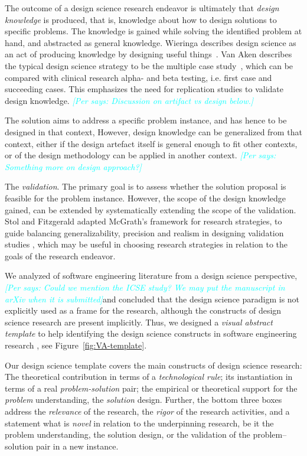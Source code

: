 \documentclass[graybox]{svmult}
\newcommand{\per}[1]{\textcolor{cyan}{{\it [Per says: #1]}}}
\newcommand{\per}[1]{}
\begin{document}
The outcome of a design science research endeavor is ultimately that \emph{design knowledge} is produced, that is, knowledge about how to design solutions to specific problems. The knowledge is gained while solving the identified problem at hand, and abstracted as general knowledge. Wieringa describes design science as an act of producing knowledge by designing useful things~\cite{wieringa_design_2009}.  Van Aken describes the typical design science strategy to be the multiple case study~\cite{van_aken_management_2004}, which can be compared with clinical research alpha- and beta testing, i.e. first case and succeeding cases. This emphasizes the need for replication studies to validate design knowledge. \per{Discussion on artifact vs design below.}

The solution aims to address a specific problem instance, and has hence to be designed in that context, However, design knowledge can be generalized from that context, either if the design artefact itself is general enough to fit other contexts, or of the design methodology can be applied in another context.
\per{Something more on design approach?}

The \emph{validation}. The primary goal is to assess whether the solution proposal is feasible for the problem instance. However, the scope of the design knowledge gained, can be extended by systematically extending the scope of the validation.  Stol and Fitzgerald adapted McGrath's framework for research strategies, to guide balancing generalizability, precision and realism in designing validation studies \cite{StolABC18}, which may be useful in choosing research strategies in relation to the goals of the research endeavor.


We analyzed of software engineering literature from a design science perspective, \per{Could we mention the ICSE study? We may put the manuscript in arXiv when it is submitted}and concluded that the design science paradigm is not explicitly used as a frame for the research, although the constructs of design science research are present implicitly. Thus, we designed a \emph{visual abstract template} to help identifying the design science constructs in software engineering research \cite{StoreyESEM17}, see Figure~\ref{fig:VA-template}. 

Our design science template covers the main constructs of design science research: The theoretical contribution in terms of a \emph{technological rule}; its instantiation in terms of a real \emph{problem-solution} pair;  the empirical or theoretical support for the \emph{problem} understanding, the \emph{solution} design. Further, the bottom three boxes address the \emph{relevance} of the research, the \emph{rigor} of the research activities, and a statement what is \emph{novel} in relation to the underpinning research, be it the problem understanding, the solution design, or the validation of the problem--solution pair in a new instance.
\end{document}
